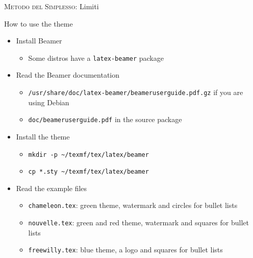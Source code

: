 \begin{frame}{\textsc{Metodo del Simplesso}: Limiti}

\end{frame}

\begin{frame}[t,fragile]{How to use the theme}
\begin{itemize}
\item Install Beamer
  \begin{itemize}
  \item Some distros have a \verb!latex-beamer! package
  \end{itemize}
\item Read the Beamer documentation
  \begin{itemize}
  \item \verb!/usr/share/doc/latex-beamer/beameruserguide.pdf.gz! if you are
        using Debian
  \item \verb!doc/beameruserguide.pdf! in the source package
  \end{itemize}
\item Install the theme
  \begin{itemize}
  \item \verb!mkdir -p ~/texmf/tex/latex/beamer!\\
  \item \verb!cp *.sty ~/texmf/tex/latex/beamer!
  \end{itemize}
\item Read the example files
  \begin{itemize}
  \item \verb!chameleon.tex!: green theme, watermark and circles for bullet
        lists
  \item \verb!nouvelle.tex!: green and red theme, watermark and squares for
        bullet lists
  \item \verb!freewilly.tex!: blue theme, a logo and squares for bullet lists
  \end{itemize}
\end{itemize}
\end{frame}

